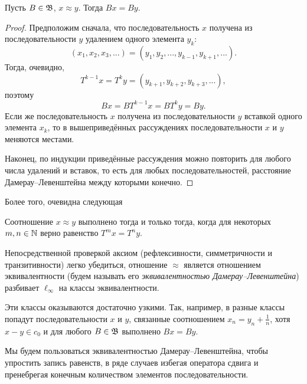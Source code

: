 \begin{lemma}
	Пусть $B\in\mathfrak{B}$, $x\approx y$.
	Тогда $Bx=By$.
\end{lemma}

\begin{proof}
	Предположим сначала, что последовательность $x$ получена из последовательности $y$ удалением одного элемента $y_k$:
	\begin{equation}
		(x_1, x_2, x_3,...) = (y_1, y_2, ..., y_{k-1}, y_{k+1}, ...)
		.
	\end{equation}
	Тогда, очевидно,
	\begin{equation}
		T^{k-1} x = T^{k}y = (y_{k+1}, y_{k+2}, y_{k+3}, ...)
		,
	\end{equation}
	поэтому
	\begin{equation}
		Bx = BT^{k-1}x = BT^{k}y = By
		.
	\end{equation}
	Если же последовательность $x$ получена из последовательности $y$ вставкой одного элемента $x_k$,
	то в вышеприведённых рассуждениях последовательности $x$ и $y$ меняются местами.

	Наконец, по индукции приведённые рассуждения можно повторить для любого числа удалений и вставок,
	то есть для любых последовательностей, расстояние Дамерау--Левенштейна между которыми конечно.
\end{proof}

Более того, очевидна следующая
\begin{lemma}
	Соотношение $x\approx y$ выполнено тогда и только тогда, когда для некоторых $m,n\in\mathbb{N}$ верно равенство $T^m x = T^n y$.
\end{lemma}

Непосредственной проверкой аксиом (рефлексивности, симметричности и транзитивности) легко убедиться,
отношение $\approx$ является отношением эквивалентности (будем называть его \emph{эквивалентностью Дамерау--Левенштейна}) разбивает $\ell_\infty$ на классы эквивалентности.

\begin{remark}
	\label{rem:Damerau_vs_c0}
	Эти классы оказываются достаточно узкими.
	Так, например, в разные классы попадут последовательности $x$ и $y$, связанные соотношением $x_n = y_n + \frac1n$,
	хотя $x-y \in c_0$ и для любого $B\in\mathfrak{B}$ выполнено $Bx=By$.
\end{remark}

Мы будем пользоваться эквивалентностью Дамерау--Левенштейна, чтобы упростить запись равенств,
в ряде случаев избегая оператора сдвига и пренебрегая конечным количеством элементов последовательности.
